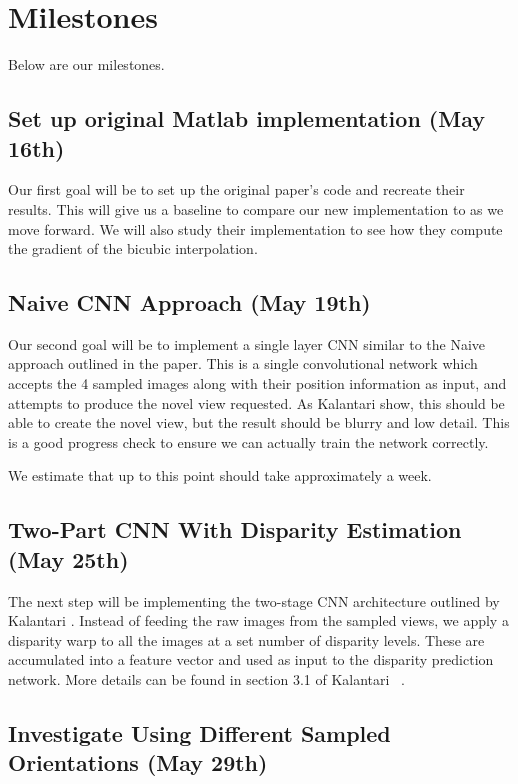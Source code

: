 \documentclass[10pt,twocolumn,letterpaper]{article}
\begin{document}
\section{Milestones}

Below are our milestones.

\subsection{Set up original Matlab implementation (May 16th)}

Our first goal will be to set up the original paper's code and recreate their results. This will
give us a baseline to compare our new implementation to as we move forward. We will also study
their implementation to see how they compute the gradient of the bicubic interpolation.

\subsection{Naive CNN Approach (May 19th)}

Our second goal will be to implement a single layer CNN similar to the
Naive approach outlined in the paper. This is a single convolutional network which
accepts the 4 sampled images along with their position information as input, and
attempts to produce the novel view requested. As Kalantari \etal show, this should be able
to create the novel view, but the result should be blurry and low detail. This is a good
progress check to ensure we can actually train the network correctly.

We estimate that up to this point should take approximately a week.

\subsection{Two-Part CNN With Disparity Estimation (May 25th)}

The next step will be implementing the two-stage CNN architecture outlined by Kalantari \etal.
Instead of feeding the raw images from the sampled views, we apply a disparity warp to all the
images at a set number of disparity levels. These are accumulated into a feature vector and used as
input to the disparity prediction network. More details can be found in section 3.1 of 
Kalantari \etal~\cite{LearningViewSynthesis}.

\subsection{Investigate Using Different Sampled Orientations (May 29th)}
\end{document}

